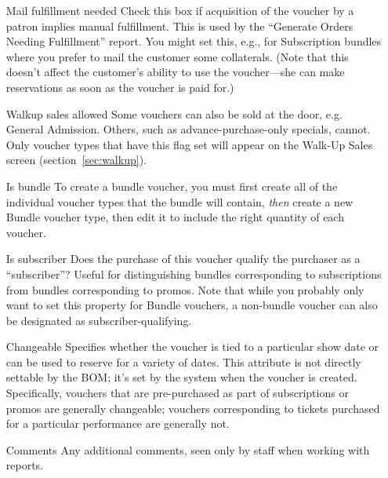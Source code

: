 \begin{itemize}

\item[Mail fulfillment needed] Check this box if acquisition of the
  voucher by a patron implies manual fulfillment.  This is used by the
  ``Generate Orders Needing Fulfillment'' report.  You might set this,
  e.g., for Subscription bundles where you prefer to mail the customer
  some collaterals.  (Note that this doesn't affect the customer's
  ability to use the voucher---she can make reservations as soon as the
  voucher is paid for.)
\item[Walkup sales allowed] Some vouchers can also be sold at the door,
  e.g. General Admission.  Others, such as advance-purchase-only
  specials, cannot.  Only voucher types that have this flag set will
  appear on the Walk-Up Sales screen (section~\ref{sec:walkup}).

\item[Is bundle] To create a bundle voucher, you must first create all
  of the individual voucher types that the bundle will contain,
  \emph{then} create a new Bundle voucher type, then edit it to include
  the right quantity of each voucher.
\item[Is subscriber] Does the purchase of this voucher qualify the
  purchaser as a ``subscriber''?  Useful for distinguishing bundles
  corresponding to subscriptions from bundles corresponding to promos.
  Note that while you probably only want to set this property for Bundle
  vouchers, a non-bundle voucher can also be designated as
  subscriber-qualifying. 
\item[Changeable] Specifies whether the voucher is tied to a particular
  show date or can be used to reserve for a variety of dates. This
  attribute is not directly settable by the BOM; it's set by the system
  when the voucher is created.  Specifically, vouchers that are
  pre-purchased as part of subscriptions or promos are generally
  changeable; vouchers corresponding to tickets purchased for a
  particular performance are generally not.
\item[Comments] Any additional comments, seen only by staff when working
  with reports.
\end{itemize}


